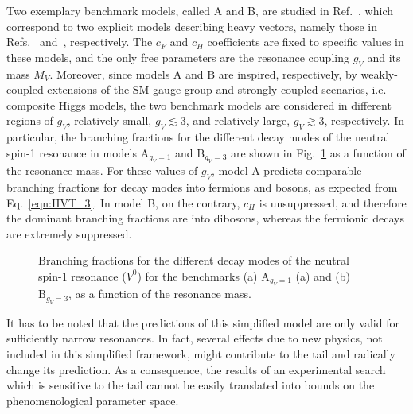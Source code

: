 Two exemplary benchmark models, called A and B, are studied in Ref.~\cite{Pappadopulo:2014qza}, which correspond to two explicit models describing heavy vectors, namely those in Refs.~\cite{PhysRevD.22.727} and~\cite{Composite1}, respectively. The $c_F$ and $c_H$ coefficients are fixed to specific values in these models, and the only free parameters are the resonance coupling $g_V$ and its mass $M_V$.
Moreover, since models A and B are inspired, respectively, by weakly-coupled extensions of the SM gauge group and strongly-coupled scenarios, i.e. composite Higgs models, the two benchmark models are considered in different regions of $g_V$, relatively small, $g_V \lesssim 3$, and relatively large, $g_V \gtrsim 3$, respectively. In particular, the branching fractions for the different decay modes of the neutral spin-1 resonance in models $\mathrm{A}_{g_V=1}$ and $\mathrm{B}_{g_V=3}$ are shown in Fig.~\ref{fig:hvtBR} as a function of the resonance mass. For these values of $g_V$, model A predicts comparable branching fractions for decay modes into fermions and bosons, as expected from Eq.~\ref{eqn:HVT_3}. In model B, on the contrary, $c_H$ is unsuppressed, and therefore the dominant branching fractions are into dibosons, whereas the fermionic decays are extremely suppressed.

\begin{figure}[!htb]
\centering
{}
\caption{Branching fractions for the different decay modes of the neutral spin-1 resonance \Zpr ($V^0$) for the benchmarks (a) $\mathrm{A}_{g_V=1}$ (a) and (b) $\mathrm{B}_{g_V=3}$, as a function of the resonance mass.}
\label{fig:hvtBR}
\end{figure}

It has to be noted that the predictions of this simplified model are only valid for sufficiently narrow resonances.
In fact, several effects due to new physics, not included in this simplified framework, might contribute to the tail and radically change its prediction.
As a consequence, the results of an experimental search which is sensitive to the tail cannot be easily translated into bounds on the phenomenological parameter space.